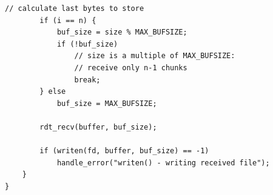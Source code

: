 \begin{lstlisting}[title=cmd\_commons.c]
		// calculate last bytes to store 
		if (i == n) {           
			buf_size = size % MAX_BUFSIZE;
			if (!buf_size)
				// size is a multiple of MAX_BUFSIZE:
				// receive only n-1 chunks
				break;          
		} else
			buf_size = MAX_BUFSIZE;
                                                                                              
		rdt_recv(buffer, buf_size);
                                                                                              
		if (writen(fd, buffer, buf_size) == -1)
			handle_error("writen() - writing received file");
	}
}
\end{lstlisting}

